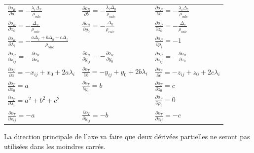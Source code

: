 \documentclass[french]{report}
\begin{document}
\begin{tabular}{l l l}
$\frac{\partial{o_R}}{\partial{a}}         = -\frac{\lambda_i \Delta_x}{\rho_{calc}}$ &
$\frac{\partial{o_R}}{\partial{b}}         = -\frac{\lambda_i \Delta_y}{\rho_{calc}}$ &
$\frac{\partial{o_R}}{\partial{c}}         = -\frac{\lambda_i \Delta_z}{\rho_{calc}}$ \\[0.3cm]

$\frac{\partial{o_R}}{\partial{x_0}}       = -\frac{\Delta_x}{\rho_{calc}}$ &
$\frac{\partial{o_R}}{\partial{y_0}}       = -\frac{\Delta_y}{\rho_{calc}}$ &
$\frac{\partial{o_R}}{\partial{z_0}}       = -\frac{\Delta_z}{\rho_{calc}}$ \\[0.3cm]

\multicolumn{2}{l}{ $\frac{\partial{o_R}}{\partial{\lambda_i}} = -\frac{a \Delta_x + b \Delta_y + c \Delta_z}{\rho_{calc}} $ } &
$\frac{\partial{o_R}}{\partial{\rho_i}}    = -1$ \\[0.3cm]

$\frac{\partial{o_R}}{\partial{x_{ij}}}    = -\frac{\partial{o_R}}{\partial{x_0}}$ &
$\frac{\partial{o_R}}{\partial{y_{ij}}}    = -\frac{\partial{o_R}}{\partial{y_0}}$ &
$\frac{\partial{o_R}}{\partial{z_{ij}}}    = -\frac{\partial{o_R}}{\partial{z_0}}$ \\[1cm]


$\frac{\partial{o_T}}{\partial{a}}         = -x_{ij}+x_0+2 a \lambda_i$ &
$\frac{\partial{o_T}}{\partial{b}}         = -y_{ij}+y_0+2 b \lambda_i$ &
$\frac{\partial{o_T}}{\partial{c}}         = -z_{ij}+z_0+2 c \lambda_i$ \\[0.3cm]

$\frac{\partial{o_T}}{\partial{x_0}}       = a$ &
$\frac{\partial{o_T}}{\partial{y_0}}       = b$ &
$\frac{\partial{o_T}}{\partial{z_0}}       = c$ \\[0.3cm]

\multicolumn{2}{l}{ $\frac{\partial{o_T}}{\partial{\lambda_i}} = a^2+b^2+c^2$ } &
$\frac{\partial{o_T}}{\partial{\rho_i}}    = 0$ \\[0.3cm]

$\frac{\partial{o_T}}{\partial{x_{ij}}}    = -a$ &
$\frac{\partial{o_T}}{\partial{y_{ij}}}    = -b$ &
$\frac{\partial{o_T}}{\partial{z_{ij}}}    = -c$ \\[0.3cm]



\end{tabular}

La direction principale de l'axe va faire que deux dérivées partielles ne seront pas utilisées dans les moindres carrés.
\end{document}

